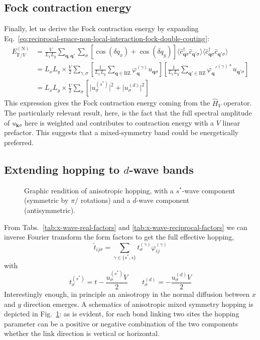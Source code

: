 \subsection{Fock contraction energy}\label{subsec:normal-fock-energy}

Finally, let us derive the Fock contraction energy by expanding Eq.~\eqref{eq:reciprocal-space-non-local-interaction-fock-double-couting}:
\begin{align}
	E_{\mathrm{F}/V}^{(\mathrm{N})} &= \frac{V}{L_x L_y} \sum_{ \mathbf{q}, \mathbf{q}'} \sum_\sigma \left[
		\cos \left(
			\delta q_x
		\right)	+ \cos \left(
			\delta q_y
		\right)	
	\right]	
	\langle
		\hat c_{\mathbf{q} \sigma}^\dagger \hat c_{\mathbf{q}' \sigma}
	\rangle \langle
		\hat c_{\mathbf{q} \sigma}^\dagger  \hat c_{\mathbf{q}' \sigma}
	\rangle \nonumber \\
	&= L_x L_y \times \frac{V}{2} \sum_{\gamma,\sigma} \left[
		\frac{1}{L_x L_y} \sum_{\mathbf{q}\in\mathrm{BZ}} \varphi_\mathbf{q}^{(\gamma)} u_{\mathbf{q}\sigma}
	\right] \left[
		\frac{1}{L_x L_y} \sum_{\mathbf{q}'\in\mathrm{BZ}} \varphi_\mathbf{q}'^{(\gamma)*} u_{\mathbf{q}'\sigma}
	\right] \nonumber \\
	&= L_x L_y \times \frac{V}{2} \sum_\sigma \left[
		\big|
			u_\sigma^{(s^*)}
		\big|^2 + \big|
			u_\sigma^{(d)}
		\big|^2
	\right] \label{eq:normal-fock-V-contraction-energy}
\end{align}
This expression gives the Fock contraction energy coming from the $\hat H_V$ operator. The particularly relevant result, here, is the fact that the full spectral amplitude of $u_{\mathbf{k}\sigma}$ here is weighted and contributes to contraction energy with a $V$ linear prefactor. This suggests that a mixed-symmetry band could be energetically preferred.

\subsection{Extending hopping to $d$-wave bands}\label{subsec:normal-d-wave-hopping}

\begin{figure}
	\centering
	
	\caption{Graphic rendition of anisotropic hopping, with a $s^*$-wave component (symmetric by $\pi/$ rotations) and a $d$-wave component (antisymmetric).}
	\label{fig:anisotropic-hopping}
\end{figure}

From Tabs.~\ref{tab:x-wave-real-factors} and \ref{tab:x-wave-reciprocal-factors} we can inverse Fourier transform the form factors to get the full effective hopping,
\[
	\tilde{t}_{ij\sigma} = \sum_{\gamma\in\lbrace s^*,s \rbrace} t^{(\gamma)}_\sigma \varphi_{ij}^{(\gamma)}
\]
with
\[
	t^{(s^*)}_\sigma = t - \frac{u_\sigma^{(s^*)} V}{2}
	\qquad
	t^{(d)}_\sigma = - \frac{u_\sigma^{(d)} V}{2}
\]
Interestingly enough, in principle an anisotropy in the normal diffusion between $x$ and $y$ direction emerges. A schematics of anisotropic mixed symmetry hopping is depicted in Fig.~\ref{fig:anisotropic-hopping}: as is evident, for each bond linking two sites the hopping parameter can be a positive or negative combination of the two components whether the link direction is vertical or horizontal. \todo

